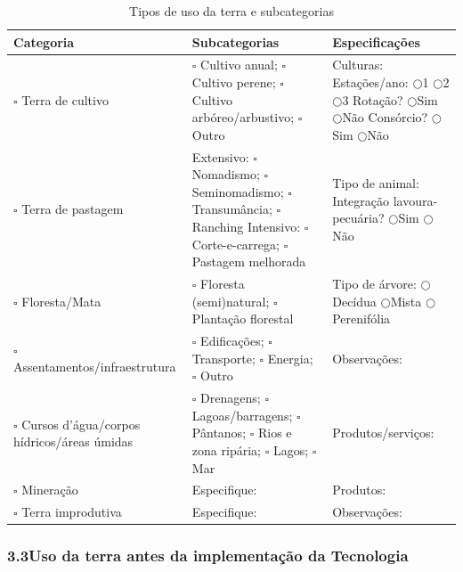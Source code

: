 \begin{table}[htbp]
\centering\small
\caption{Tipos de uso da terra e subcategorias}
\label{tab:app_land_use}
\begin{tabular}{p{3.2cm}p{5.5cm}p{5.5cm}}
\toprule
\textbf{Categoria} & \textbf{Subcategorias} & \textbf{Especificações} \\
\midrule
$\square$ Terra de cultivo &
  $\square$ Cultivo anual;
  $\square$ Cultivo perene;
  $\square$ Cultivo arbóreo/arbustivo;
  $\square$ Outro &
  Culturas: \dotfill \newline
  Estações/ano: $\bigcirc$1 $\bigcirc$2 $\bigcirc$3 \newline
  Rotação? $\bigcirc$Sim $\bigcirc$Não \newline
  Consórcio? $\bigcirc$Sim $\bigcirc$Não \\
\addlinespace
$\square$ Terra de pastagem &
  Extensivo: $\square$ Nomadismo; $\square$ Seminomadismo; $\square$ Transumância; $\square$ Ranching \newline
  Intensivo: $\square$ Corte-e-carrega; $\square$ Pastagem melhorada &
  Tipo de animal: \dotfill \newline
  Integração lavoura-pecuária? $\bigcirc$Sim $\bigcirc$Não \\
\addlinespace
$\square$ Floresta/Mata &
  $\square$ Floresta (semi)natural; $\square$ Plantação florestal &
  Tipo de árvore: \dotfill \newline
  $\bigcirc$Decídua $\bigcirc$Mista $\bigcirc$Perenifólia \\
\addlinespace
$\square$ Assentamentos/infraestrutura &
  $\square$ Edificações; $\square$ Transporte; $\square$ Energia; $\square$ Outro &
  Observações: \dotfill \\
\addlinespace
$\square$ Cursos d'água/corpos hídricos/áreas úmidas &
  $\square$ Drenagens; $\square$ Lagoas/barragens; $\square$ Pântanos; $\square$ Rios e zona ripária; $\square$ Lagos; $\square$ Mar &
  Produtos/serviços: \dotfill \\
\addlinespace
$\square$ Mineração &
  Especifique: \dotfill &
  Produtos: \dotfill \\
\addlinespace
$\square$ Terra improdutiva &
  Especifique: \dotfill &
  Observações: \dotfill \\
\bottomrule
\end{tabular}
\end{table}

\subsubsection*{3.3\quad Uso da terra antes da implementação da Tecnologia}

